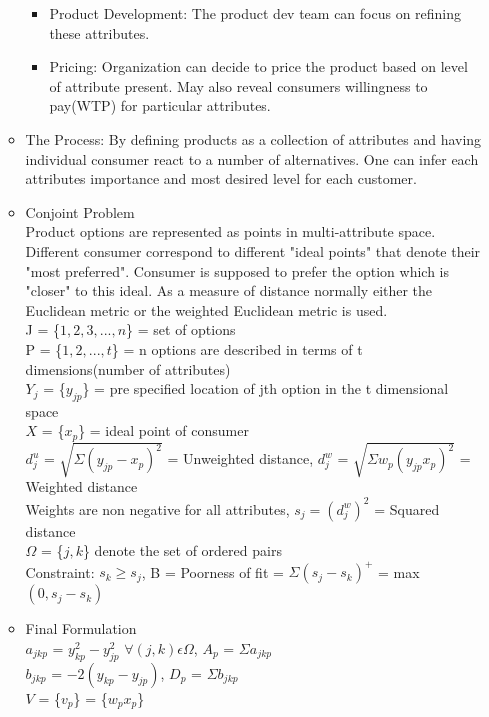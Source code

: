 \documentclass[a4paper]{article}
\begin{document}
\begin{enumerate}
\begin{itemize}
\begin{itemize}
             \item Product Development: The product dev team can focus on refining these attributes.
             \item Pricing: Organization can decide to price the product based on level of attribute present. May also reveal consumers willingness to pay(WTP) for particular attributes.
         \end{itemize}
         \item The Process: By defining products as a collection of attributes and having individual consumer react to a number of alternatives. One can infer each attributes importance and most desired level for each customer.
         \item Conjoint Problem\\
         Product options are represented as points in multi-attribute space. Different consumer correspond to different "ideal points" that denote their "most preferred". Consumer is supposed to prefer the option which is "closer" to this ideal. As a measure of distance normally either the Euclidean metric or the weighted Euclidean metric is used.\\
         J = \{$1, 2, 3, ..., n$\} = set of options\\
         P = \{$1,2,...,t$\} = n options are described in terms of t dimensions(number of attributes)\\
         $Y_j$ = \{$y_{jp}$\} = pre specified location of jth option in the t dimensional space\\
         $X$ = \{$x_p$\} = ideal point of consumer\\
         $d_j^u$ = $\sqrt{\Sigma(y_{jp} - x_p)^2}$ = Unweighted distance, $d_j^w$ = $\sqrt{\Sigma w_p(y_{jp}x_p)^2}$ = Weighted distance\\
         Weights are non negative for all attributes, $s_j = (d_j^w)^2$ = Squared distance\\
         $\Omega$ = \{$j,k$\} denote the set of ordered pairs\\
         Constraint: $s_k \geq s_j$, B = Poorness of fit = $\Sigma(s_j - s_k)^+ $ = max$(0,s_j-s_k)$
         \item Final Formulation\\
         $a_{jkp}$ = $y_{kp}^2 - y_{jp}^2$ $\forall (j,k)\epsilon \Omega$, $A_p$ = $\Sigma a_{jkp}$\\
         $b_{jkp}$ = $-2(y_{kp} - y_{jp})$, $D_p$ = $\Sigma b_{jkp}$\\
         $V$ = \{$v_p$\} = \{$w_px_p$\}\\

\end{itemize}
\end{enumerate}
\end{document}
